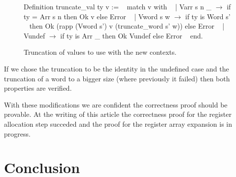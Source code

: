 \documentclass{article}
\begin{document}
\begin{figure}[t]
\obeylines\obeyspaces\ttfamily%
Definition truncate\_val ty v :=
~ match v with
~ | Varr s n \_ \(\rightarrow\) if ty = Arr s n then Ok v else Error
~ | Vword s w \(\rightarrow\) if ty is Word s'
~   then Ok (rapp (Vword s') v (truncate\_word s' w)) else Error
~ | Vundef \(\rightarrow\) if ty is Arr \_ then Ok Vundef else Error
~ end.
\normalfont%
\caption{Truncation of values to use with the new contexts.}
\end{figure}

If we chose the truncation to be the identity in the undefined case and the
truncation of a word to a bigger size (where previously it failed) then both
properties are verified.

\medskip

With these modifications we are confident the correctness proof should be
provable. At the writing of this article the correctness proof for the register
allocation step succeded and the proof for the register array expansion is in
progress.

\section{Conclusion}\label{sec:ccl}
\end{document}
